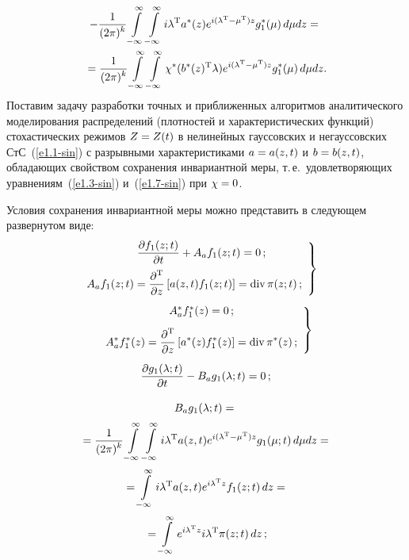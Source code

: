 \begin{multicols}{2}
\vspace*{-12pt}

\noindent
\begin{multline*}
-\displaystyle\frac{\displaystyle 1\mathstrut}{\displaystyle (2\pi)^k\mathstrut} \int\limits_{-\infty}^\infty  \int\limits_{-\infty}^\infty i\lambda^{\mathrm{T}} a^*(z) e^{i(\lambda^{\mathrm{T}}-\mu^{\mathrm{T}})z} g_1^*(\mu)\, d\mu dz={}\\
{}=\displaystyle\frac{\displaystyle 1\mathstrut}{\displaystyle (2\pi)^k\mathstrut} \int\limits_{-\infty}^\infty  \int\limits_{-\infty}^\infty \chi^*(b^*(z)^{\mathrm{T}}\lambda) e^{i(\lambda^{\mathrm{T}}-\mu^{\mathrm{T}})z} g_1^*(\mu)\, d\mu dz.
\end{multline*}
Поставим задачу разработки точных и приближенных  алгоритмов
аналитического моделирования распределений (плотностей и
характеристических функций) стохастических режимов  $Z\hm=Z(t)$ в
нелинейных гауссовских и негауссовских СтС~(\ref{e1.1-sin})  с разрывными
характеристиками $a\hm=a(z,t)$ и $b\hm=b(z,t)$, обладающих свойством
сохранения инвариантной меры, т.\,е.\ удовлетворяющих уравнениям~(\ref{e1.3-sin})
и~(\ref{e1.7-sin}) при $\chi\hm=0$.

Условия сохранения инвариантной меры можно представить в следующем развернутом виде:
\begin{equation}
\left.
\begin{array}{c}
\displaystyle\fr{\prt f_1 (z;t)}{\prt t} + A_a f_1 (z;t) =0\,;\\[9pt] 
\hspace*{-4.5mm}\displaystyle A_a f_1(z;t) = 
    \fr{\prt^{\mathrm{T}}}{\prt z} \lk a(z,t) f_1(z;t)\rk = \mathrm{div}\, \pi(z;t)\,;
    \end{array}
    \right\}
    \label{e1.18-sin}
    \end{equation}
\begin{equation}
\left.
\begin{array}{c}
A_a^* f_1^*(z) =0\,;\\[9pt]
\displaystyle A_a^* f_1^* (z) = \displaystyle\frac{\displaystyle \partial^{\mathrm{T}}\mathstrut}{\displaystyle  \partial z\mathstrut} \left[ a^* 
(z) f_1^* (z)\right] =\mathrm{div}\, \pi^* (z)\,;
\end{array}
\right\}
\label{e1.19-sin}
\end{equation}
$$
\displaystyle\frac{\displaystyle \partial g_1 (\lambda;t)\mathstrut}{\displaystyle \partial t\mathstrut} - B_a g_1(\lambda;t) =0\,;
$$

\vspace*{-14pt}

\noindent
\begin{multline}
B_a g_1(\lambda;t) ={}\\[2pt]
{}=\displaystyle\frac{\displaystyle 1\mathstrut}{\displaystyle (2\pi)^k\mathstrut} \int\limits_{-\infty}^\infty\int\limits_{-\infty}^\infty i\lambda^{\mathrm{T}} a(z,t) e^{i(\lambda^{\mathrm{T}}-\mu^{\mathrm{T}})z}
 g_1(\mu;t)\, d\mu dz={}\\[2pt]
{}= \int\limits_{-\infty}^\infty i\lambda^{\mathrm{T}} a(z,t) e^{i\lambda^{\mathrm{T}}z} f_1(z;t)\, dz={}\\[2pt]
{}= \int\limits_{-\infty}^\infty e^{i\lambda^{\mathrm{T}} z} i\lambda^{\mathrm{T}} \pi(z;t)\, dz\,;
\label{e1.20-sin}
\end{multline}


\end{multicols}
